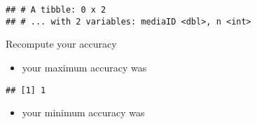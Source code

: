 \documentclass[]{article}
\newenvironment{Shaded}{\begin{snugshade}}{\end{snugshade}}
\newcommand{\KeywordTok}[1]{\textcolor[rgb]{0.13,0.29,0.53}{\textbf{#1}}}
\newcommand{\DataTypeTok}[1]{\textcolor[rgb]{0.13,0.29,0.53}{#1}}
\newcommand{\DecValTok}[1]{\textcolor[rgb]{0.00,0.00,0.81}{#1}}
\newcommand{\CommentTok}[1]{\textcolor[rgb]{0.56,0.35,0.01}{\textit{#1}}}
\newcommand{\OperatorTok}[1]{\textcolor[rgb]{0.81,0.36,0.00}{\textbf{#1}}}
\newcommand{\NormalTok}[1]{#1}
\providecommand{\tightlist}{%
  \setlength{\itemsep}{0pt}\setlength{\parskip}{0pt}}
\begin{document}
\begin{Shaded}
\end{Shaded}

\begin{verbatim}
## # A tibble: 0 x 2
## # ... with 2 variables: mediaID <dbl>, n <int>
\end{verbatim}

Recompute your accuracy

\begin{Shaded}
\end{Shaded}

\begin{itemize}
\tightlist
\item
  your maximum accuracy was
\end{itemize}

\begin{Shaded}
\end{Shaded}

\begin{verbatim}
## [1] 1
\end{verbatim}

\begin{itemize}
\tightlist
\item
  your minimum accuracy was
\end{itemize}

\begin{Shaded}
\end{Shaded}
\end{document}
